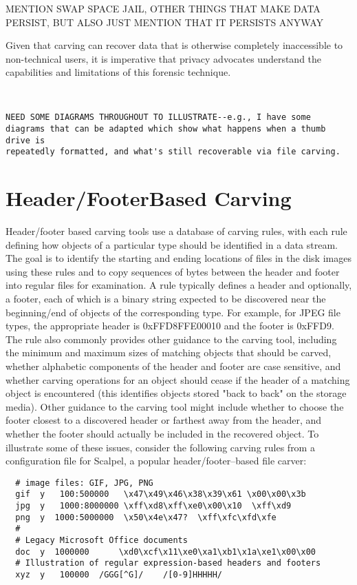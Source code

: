 MENTION SWAP SPACE JAIL, OTHER THINGS THAT MAKE DATA PERSIST, BUT ALSO JUST MENTION THAT IT PERSISTS ANYWAY   

Given that carving can recover data that is otherwise completely inaccessible to non-technical users, it is imperative that privacy advocates understand the capabilities and limitations of this forensic technique.  

\begin{Verbatim}


NEED SOME DIAGRAMS THROUGHOUT TO ILLUSTRATE--e.g., I have some 
diagrams that can be adapted which show what happens when a thumb drive is
repeatedly formatted, and what's still recoverable via file carving.
\end{Verbatim}

\section{Header/Footer\-Based Carving}

Header/footer based carving tools use a database of carving rules, with each rule defining how objects of a particular type should be identified in a data stream.  The goal is to identify the starting and ending locations of files in the disk images using these rules and to copy sequences of bytes between the header and footer into regular files for examination.  A rule typically defines a header and optionally, a footer, each of which is a binary string expected to be discovered near the beginning/end of objects of the corresponding type.  For example, for JPEG file types, the appropriate header is 0xFFD8FFE00010 and the footer is 0xFFD9.  The rule also commonly provides other guidance to the carving tool, including the minimum and maximum sizes of matching objects that should be carved, whether alphabetic components of the header and footer are case sensitive, and whether carving operations for an object should cease if the header of a matching object is encountered (this identifies objects stored "back to back" on the storage media).  Other guidance to the carving tool might include whether to choose the footer closest to a discovered header or farthest away from the header, and whether the footer should actually be included in the recovered object.  To illustrate some of these issues, consider the following carving rules from a configuration file for Scalpel, a popular header/footer--based file carver:

{
\begin{Verbatim}
  # image files: GIF, JPG, PNG
  gif  y   100:500000   \x47\x49\x46\x38\x39\x61 \x00\x00\x3b
  jpg  y   1000:8000000 \xff\xd8\xff\xe0\x00\x10  \xff\xd9
  png  y  1000:5000000  \x50\x4e\x47?  \xff\xfc\xfd\xfe
  #
  # Legacy Microsoft Office documents
  doc  y  1000000      \xd0\xcf\x11\xe0\xa1\xb1\x1a\xe1\x00\x00 
  # Illustration of regular expression-based headers and footers
  xyz  y   100000  /GGG[^G]/    /[0-9]HHHHH/
\end{Verbatim}
}

